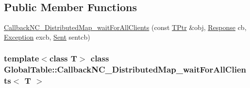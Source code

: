 \subsection*{Public Member Functions}
\begin{DoxyCompactItemize}
\item 
\hyperlink{class_global_table_1_1_callback_n_c___distributed_map__wait_for_all_clients_a129bb08f4a7d4b49cfdf4119f462909e}{CallbackNC\_\-DistributedMap\_\-waitForAllClients} (const \hyperlink{class_global_table_1_1_callback_n_c___distributed_map__wait_for_all_clients_ad382f8070b09e44e81075151fd811634}{TPtr} \&obj, \hyperlink{class_global_table_1_1_callback_n_c___distributed_map__wait_for_all_clients_a86f9430f8e3319d74484f2c3678c36bd}{Response} cb, \hyperlink{class_global_table_1_1_callback_n_c___distributed_map__wait_for_all_clients_a839e50155924aac25bbf989dadbc8275}{Exception} excb, \hyperlink{class_global_table_1_1_callback_n_c___distributed_map__wait_for_all_clients_a3ee9a892cbd5431e6d2cd0c48336f315}{Sent} sentcb)
\end{DoxyCompactItemize}
\subsubsection*{template$<$class T$>$ class GlobalTable::CallbackNC\_\-DistributedMap\_\-waitForAllClients$<$ T $>$}



